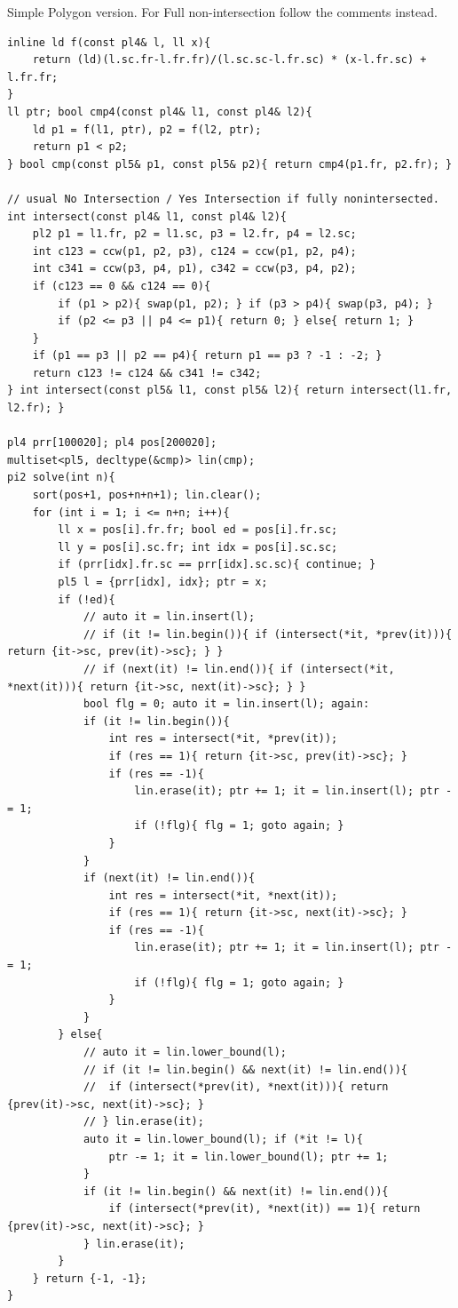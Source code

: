 Simple Polygon version. For Full non-intersection follow the comments instead.
\begin{verbatim}
inline ld f(const pl4& l, ll x){
	return (ld)(l.sc.fr-l.fr.fr)/(l.sc.sc-l.fr.sc) * (x-l.fr.sc) + l.fr.fr;
}
ll ptr; bool cmp4(const pl4& l1, const pl4& l2){
	ld p1 = f(l1, ptr), p2 = f(l2, ptr);
	return p1 < p2;
} bool cmp(const pl5& p1, const pl5& p2){ return cmp4(p1.fr, p2.fr); }

// usual No Intersection / Yes Intersection if fully nonintersected.
int intersect(const pl4& l1, const pl4& l2){
	pl2 p1 = l1.fr, p2 = l1.sc, p3 = l2.fr, p4 = l2.sc;
	int c123 = ccw(p1, p2, p3), c124 = ccw(p1, p2, p4);
	int c341 = ccw(p3, p4, p1), c342 = ccw(p3, p4, p2);
	if (c123 == 0 && c124 == 0){
		if (p1 > p2){ swap(p1, p2); } if (p3 > p4){ swap(p3, p4); }
		if (p2 <= p3 || p4 <= p1){ return 0; } else{ return 1; }
	}
	if (p1 == p3 || p2 == p4){ return p1 == p3 ? -1 : -2; }
	return c123 != c124 && c341 != c342;
} int intersect(const pl5& l1, const pl5& l2){ return intersect(l1.fr, l2.fr); }

pl4 prr[100020]; pl4 pos[200020];
multiset<pl5, decltype(&cmp)> lin(cmp);
pi2 solve(int n){
	sort(pos+1, pos+n+n+1); lin.clear();
	for (int i = 1; i <= n+n; i++){
		ll x = pos[i].fr.fr; bool ed = pos[i].fr.sc;
		ll y = pos[i].sc.fr; int idx = pos[i].sc.sc;
		if (prr[idx].fr.sc == prr[idx].sc.sc){ continue; }
		pl5 l = {prr[idx], idx}; ptr = x;
		if (!ed){
			// auto it = lin.insert(l);
			// if (it != lin.begin()){ if (intersect(*it, *prev(it))){ return {it->sc, prev(it)->sc}; } }
			// if (next(it) != lin.end()){ if (intersect(*it, *next(it))){ return {it->sc, next(it)->sc}; } }
			bool flg = 0; auto it = lin.insert(l); again:
			if (it != lin.begin()){
				int res = intersect(*it, *prev(it));
				if (res == 1){ return {it->sc, prev(it)->sc}; }
				if (res == -1){
					lin.erase(it); ptr += 1; it = lin.insert(l); ptr -= 1;
					if (!flg){ flg = 1; goto again; }
				}
			}
			if (next(it) != lin.end()){
				int res = intersect(*it, *next(it));
				if (res == 1){ return {it->sc, next(it)->sc}; }
				if (res == -1){
					lin.erase(it); ptr += 1; it = lin.insert(l); ptr -= 1;
					if (!flg){ flg = 1; goto again; }
				}
			}
		} else{
			// auto it = lin.lower_bound(l);
			// if (it != lin.begin() && next(it) != lin.end()){
			//	if (intersect(*prev(it), *next(it))){ return {prev(it)->sc, next(it)->sc}; }
			// } lin.erase(it);
			auto it = lin.lower_bound(l); if (*it != l){
				ptr -= 1; it = lin.lower_bound(l); ptr += 1;
			}
			if (it != lin.begin() && next(it) != lin.end()){
				if (intersect(*prev(it), *next(it)) == 1){ return {prev(it)->sc, next(it)->sc}; }
			} lin.erase(it);
		}
	} return {-1, -1};
}


\end{verbatim}
